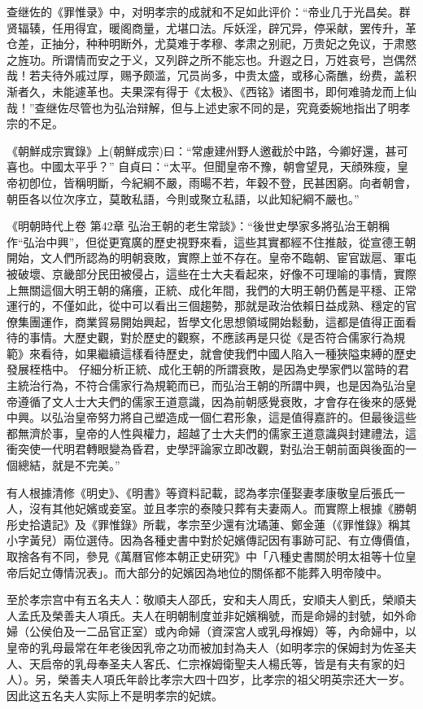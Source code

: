 查继佐的《罪惟录》中，对明孝宗的成就和不足如此评价：“帝业几于光昌矣。群贤辐辏，任用得宜，暖阁商量，尤堪口法。斥妖淫，辟冗异，停采献，罢传升，革仓差，正抽分，种种明断外，尤莫难于孝穆、孝肃之别祀，万贵妃之免议，于肃愍之旌功。所谓情而安之于义，又列辟之所不能忘也。升遐之日，万姓哀号，岂偶然哉！若夫待外戚过厚，赐予颇滥，冗员尚多，中贵太盛，或移心斋醮，纷费，盖积渐者久，未能遽革也。夫果深有得于《太极》、《西铭》诸图书，即何难骑龙而上仙哉！”查继佐尽管也为弘治辩解，但与上述史家不同的是，究竟委婉地指出了明孝宗的不足。

《朝鮮成宗實錄》上(朝鮮成宗)曰：“常慮建州野人邀截於中路，今卿好還，甚可喜也。中國太平乎？” 自貞曰：“太平。但聞皇帝不豫，朝會望見，天顔殊瘦，皇帝初卽位，皆稱明斷，今紀綱不嚴，雨暘不若，年穀不登，民甚困窮。向者朝會，朝臣各以位次序立，莫敢私語，今則或聚立私語，以此知紀綱不嚴也。”

《明朝時代上卷 第42章 弘治王朝的老生常談》：“後世史學家多將弘治王朝稱作“弘治中興”，但從更寬廣的歷史視野來看，這些其實都經不住推敲，從宣德王朝開始，文人們所認為的明朝衰敗，實際上並不存在。皇帝不臨朝、宦官跋扈、軍屯被破壞、京畿部分民田被侵占，這些在士大夫看起來，好像不可理喻的事情，實際上無關這個大明王朝的痛癢，正統、成化年間，我們的大明王朝仍舊是平穩、正常運行的，不僅如此，從中可以看出三個趨勢，那就是政治依賴日益成熟、穩定的官僚集團運作，商業貿易開始興起，哲學文化思想領域開始鬆動，這都是值得正面看待的事情。大歷史觀，對於歷史的觀察，不應該再是只從《是否符合儒家行為規範》來看待，如果繼續這樣看待歷史，就會使我們中國人陷入一種狹隘束縛的歷史發展桎梏中。 仔細分析正統、成化王朝的所謂衰敗，是因為史學家們以當時的君主統治行為，不符合儒家行為規範而已，而弘治王朝的所謂中興，也是因為弘治皇帝遵循了文人士大夫們的儒家王道意識，因為前朝感覺衰敗，才會存在後來的感覺中興。以弘治皇帝努力將自己塑造成一個仁君形象，這是值得嘉許的。但最後這些都無濟於事，皇帝的人性與權力，超越了士大夫們的儒家王道意識與封建禮法，這衝突使一代明君轉眼變為昏君，史學評論家立即改觀，對弘治王朝前面與後面的一個總結，就是不完美。”

有人根據清修《明史》、《明書》等資料記載，認為孝宗僅娶妻孝康敬皇后張氏一人，沒有其他妃嬪或妾室。並且孝宗的泰陵只葬有夫妻兩人。而實際上根據《勝朝彤史拾遺記》及《罪惟錄》所載，孝宗至少還有沈璚蓮、鄭金蓮（《罪惟錄》稱其小字黃兒）兩位選侍。因為各種史書中對於妃嬪傳記因有事跡可記、有立傳價值，取捨各有不同，參見《萬曆官修本朝正史研究》中「八種史書關於明太祖等十位皇帝后妃立傳情況表」。而大部分的妃嬪因為地位的關係都不能葬入明帝陵中。

至於孝宗宫中有五名夫人：敬順夫人邵氏，安和夫人周氏，安順夫人劉氏，榮順夫人孟氏及榮善夫人項氏。夫人在明朝制度並非妃嬪稱號，而是命婦的封號，如外命婦（公侯伯及一二品官正室）或內命婦（資深宮人或乳母褓姆）等，內命婦中，以皇帝的乳母最常在年老後因乳帝之功而被加封為夫人（如明孝宗的保姆封为佐圣夫人、天启帝的乳母奉圣夫人客氏、仁宗褓姆衛聖夫人楊氏等，皆是有夫有家的妇人）。另，榮善夫人項氏年龄比孝宗大四十四岁，比孝宗的祖父明英宗还大一岁。因此这五名夫人实际上不是明孝宗的妃嫔。

